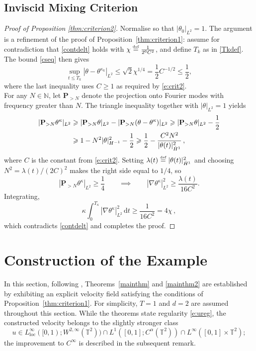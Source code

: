 \documentclass[12pt]{report}   %
\newcommand{\defeq}{\stackrel{\scriptscriptstyle\textup{def}}{=}}
\renewcommand{\le}{\leqslant}
\renewcommand{\leq}{\leqslant}
\renewcommand{\ge}{\geqslant}
\renewcommand{\geq}{\geqslant}
\numberwithin{equation}{section}
\theoremstyle{plain}
\theoremstyle{definition}
\theoremstyle{remark}
\DeclarePairedDelimiter{\abs}{\lvert}{\rvert}
\newcommand{\rmd}{\, \mathrm{d}}
\begin{document}
\subsection{Inviscid Mixing Criterion}

\begin{proof}[Proof of Proposition \ref{thm:criterion2}]
  Normalise so that $|\theta_0|_{L^2} = 1$. The argument is a refinement of the proof of Proposition~\ref{thm:criterion1}: assume for contradiction that \eqref{contdelt} holds with $\chi \defeq \frac{1}{2^6 C^2}$, and define $T_k$ as in \eqref{Tkdef}. The bound \eqref{cseq} then gives
   \[\sup_{t\le T_k}|\theta -\theta^{\kappa_k}|_{L^2}\le \sqrt{2}{\chi}^{1/4}=  \frac{1}{2}{C}^{-1/2}\leq \frac{1}{2},\]
  where the last inequality uses $C\geq 1$ as required by \eqref{e:crit2}. \\
  For any $N\in\mathbb{N}$, let $\mathbf{P}_{>N}$ denote the projection onto Fourier modes with frequency greater than $N$. The triangle inequality together with $|\theta|_{L^2}=1$ yields
  \begin{align*}
    |\mathbf{P}_{>N}\theta^\kappa|_{L^2}
      &\ge |\mathbf{P}_{>N}\theta|_{L^2}-|\mathbf{P}_{>N}(\theta-\theta^\kappa)|_{L^2}
      \ge
	|\mathbf{P}_{>N}\theta|_{L^2}
	- \frac{1}{2}
    \\
      &\ge 1-N^2|\theta|_{H^{-1}}^2-\frac{1}{2}
      \geq \frac{1}{2}
	-\frac{C^2N^2}{\abs{\theta(t)}_{\dot H^1}^2} \,,
  \end{align*}
where $C$ is the constant from \eqref{e:crit2}.
Setting $\lambda(t) \defeq \abs{\theta(t)}_{\dot H^1}^2$ and choosing $N^2 = \lambda(t)/(2C)^2$ makes the right side equal to $1/4$, so
\begin{equation*}
  |\mathbf{P}_{>N}\theta^\kappa|_{L^2} \ge\frac{1}{4}  \qquad \implies \qquad |\nabla\theta^\kappa|^2_{L^2}\ge \frac{\lambda(t)}{16C^2}.
\end{equation*}
Integrating, \[
\kappa\int_0^{T_\kappa}|\nabla\theta^\kappa|_{L^2}^2\rmd t\ge \frac{1}{16C^2}=4\chi\,,\]
which contradicts \eqref{contdelt} and completes the proof.
  \end{proof}
  
\section{Construction of the Example}\label{sec:ex}

In this section, following \cite{DrivasElgindiEA22}, Theorems~\ref{mainthm} and \ref{mainthm2} are established by exhibiting an explicit velocity field satisfying the conditions of Proposition~\ref{thm:criterion1}.
For simplicity, $T = 1$ and $d = 2$ are assumed throughout this section.
While the theorems state regularity \eqref{e:ureg}, the constructed velocity belongs to the slightly stronger class
\begin{equation*}
  u\in  L^\infty_{\mathrm{loc}}([0,1); W^{2,\infty}(\mathbb{T}^2))\cap L^1([0,1]; C^\alpha(\mathbb{T}^2)) \cap L^\infty([0,1]\times \mathbb{T}^2);
\end{equation*}
the improvement to $C^\infty$ is described in the subsequent remark.
\end{document}

